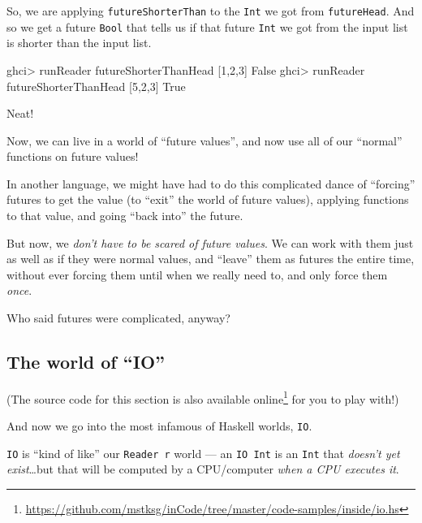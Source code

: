 \documentclass[]{article}
\newenvironment{Shaded}{}{}
\newcommand{\DataTypeTok}[1]{\textcolor[rgb]{0.56,0.13,0.00}{#1}}
\newcommand{\DecValTok}[1]{\textcolor[rgb]{0.25,0.63,0.44}{#1}}
\newcommand{\NormalTok}[1]{#1}
\newcommand{\OperatorTok}[1]{\textcolor[rgb]{0.40,0.40,0.40}{#1}}
\renewcommand{\href}[2]{#2\footnote{\url{#1}}}
\begin{document}
So, we are applying \texttt{futureShorterThan} to the \texttt{Int} we got from
\texttt{futureHead}. And so we get a future \texttt{Bool} that tells us if that
future \texttt{Int} we got from the input list is shorter than the input list.

\begin{Shaded}
\begin{Highlighting}[]
\NormalTok{ghci}\OperatorTok{\textgreater{}}\NormalTok{ runReader futureShorterThanHead [}\DecValTok{1}\NormalTok{,}\DecValTok{2}\NormalTok{,}\DecValTok{3}\NormalTok{]}
\DataTypeTok{False}
\NormalTok{ghci}\OperatorTok{\textgreater{}}\NormalTok{ runReader futureShorterThanHead [}\DecValTok{5}\NormalTok{,}\DecValTok{2}\NormalTok{,}\DecValTok{3}\NormalTok{]}
\DataTypeTok{True}
\end{Highlighting}
\end{Shaded}

Neat!

Now, we can live in a world of ``future values'', and now use all of our
``normal'' functions on future values!

In another language, we might have had to do this complicated dance of
``forcing'' futures to get the value (to ``exit'' the world of future values),
applying functions to that value, and going ``back into'' the future.

But now, we \emph{don't have to be scared of future values}. We can work with
them just as well as if they were normal values, and ``leave'' them as futures
the entire time, without ever forcing them until when we really need to, and
only force them \emph{once}.

Who said futures were complicated, anyway?

\subsection{The world of ``IO''}\label{the-world-of-io}

(The source code for this section is
\href{https://github.com/mstksg/inCode/tree/master/code-samples/inside/io.hs}{also
available online} for you to play with!)

And now we go into the most infamous of Haskell worlds, \texttt{IO}.

\texttt{IO} is ``kind of like'' our \texttt{Reader\ r} world --- an
\texttt{IO\ Int} is an \texttt{Int} that \emph{doesn't yet exist}\ldots but that
will be computed by a CPU/computer \emph{when a CPU executes it}.
\end{document}
